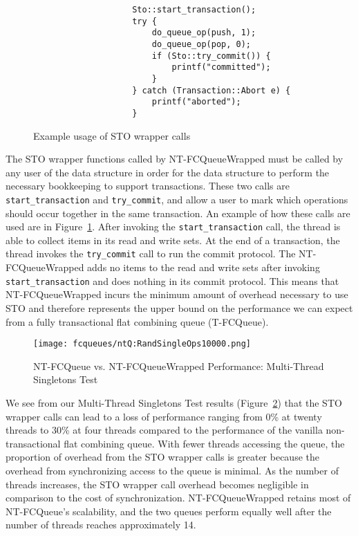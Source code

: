 \begin{figure}[t!]
\centering
\singlespace
{}
	\begin{lstlisting}
                    Sto::start_transaction();
                    try {
                        do_queue_op(push, 1);
                        do_queue_op(pop, 0);
                        if (Sto::try_commit()) {
                            printf("committed");
                        }
                    } catch (Transaction::Abort e) {
                        printf("aborted");
                    }
	\end{lstlisting}
\caption{Example usage of STO wrapper calls}
\label{fig:wrappers}
\end{figure}
The STO wrapper functions called by NT-FCQueueWrapped must be called by any user of the data structure in order for the data structure to perform the necessary bookkeeping to support transactions.
These two calls are \texttt{start\_transaction} and \texttt{try\_commit}, and allow a user to mark which operations should occur together in the same transaction. An example of how these calls are used are in Figure~\ref{fig:wrappers}. After invoking the \texttt{start\_transaction} call, the thread is able to collect items in its read and write sets. At the end of a transaction, the thread invokes the \texttt{try\_commit} call to run the commit protocol. The NT-FCQueueWrapped adds no items to the read and write sets after invoking \texttt{start\_transaction} and does nothing in its commit protocol. This means that NT-FCQueueWrapped incurs the minimum amount of overhead necessary to use STO and therefore represents the upper bound on the performance we can expect from a fully transactional flat combining queue (T-FCQueue). 

\begin{figure}[t!]
    \centering
   	\begin{minipage}{\textwidth}
        {\texttt{[image: fcqueues/ntQ:RandSingleOps10000.png]}}
	\end{minipage}
   \caption{NT-FCQueue vs. NT-FCQueueWrapped Performance: Multi-Thread Singletons Test}
    \label{fig:wrappedqs}
\end{figure}


We see from our Multi-Thread Singletons Test results (Figure~\ref{fig:wrappedqs}) that the STO wrapper calls can lead to a loss of performance ranging from 0\% at twenty threads to 30\% at four threads compared to the performance of the vanilla non-transactional flat combining queue. 
 With fewer threads accessing the queue, the proportion of overhead from the STO wrapper calls is greater because the overhead from synchronizing access to the queue is minimal. As the number of threads increases, the STO wrapper call overhead becomes negligible in comparison to the cost of synchronization.
NT-FCQueueWrapped retains most of NT-FCQueue's scalability, and the two queues perform equally well after the number of threads reaches approximately 14.

